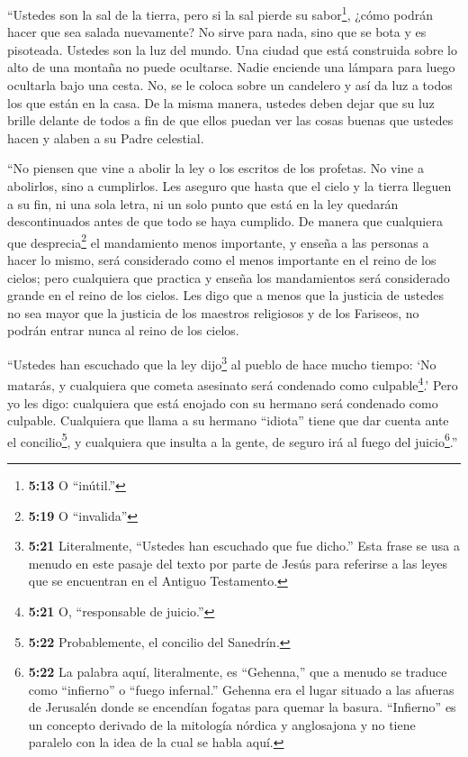  ``Ustedes son la sal de la tierra, pero si la sal pierde
su sabor\footnote{\textbf{5:13} O ``inútil.''}, ¿cómo podrán hacer que
sea salada nuevamente? No sirve para nada, sino que se bota y es
pisoteada.  Ustedes son la luz del mundo. Una ciudad que
está construida sobre lo alto de una montaña no puede ocultarse.
 Nadie enciende una lámpara para luego ocultarla bajo una
cesta. No, se le coloca sobre un candelero y así da luz a todos los que
están en la casa.  De la misma manera, ustedes deben dejar
que su luz brille delante de todos a fin de que ellos puedan ver las
cosas buenas que ustedes hacen y alaben a su Padre celestial.

 ``No piensen que vine a abolir la ley o los escritos de
los profetas. No vine a abolirlos, sino a cumplirlos.  Les
aseguro que hasta que el cielo y la tierra lleguen a su fin, ni una sola
letra, ni un solo punto que está en la ley quedarán descontinuados antes
de que todo se haya cumplido.  De manera que cualquiera que
desprecia\footnote{\textbf{5:19} O ``invalida''} el mandamiento menos
importante, y enseña a las personas a hacer lo mismo, será considerado
como el menos importante en el reino de los cielos; pero cualquiera que
practica y enseña los mandamientos será considerado grande en el reino
de los cielos.  Les digo que a menos que la justicia de
ustedes no sea mayor que la justicia de los maestros religiosos y de los
Fariseos, no podrán entrar nunca al reino de los cielos.

 ``Ustedes han escuchado que la ley dijo\footnote{\textbf{5:21}
  Literalmente, ``Ustedes han escuchado que fue dicho.'' Esta frase se
  usa a menudo en este pasaje del texto por parte de Jesús para
  referirse a las leyes que se encuentran en el Antiguo Testamento.} al
pueblo de hace mucho tiempo: `No matarás, y cualquiera que cometa
asesinato será condenado como culpable\footnote{\textbf{5:21} O,
  ``responsable de juicio.''}.'  Pero yo les digo:
cualquiera que está enojado con su hermano será condenado como culpable.
Cualquiera que llama a su hermano ``idiota'' tiene que dar cuenta ante
el concilio\footnote{\textbf{5:22} Probablemente, el concilio del
  Sanedrín.}, y cualquiera que insulta a la gente, de seguro irá al
fuego del juicio\footnote{\textbf{5:22} La palabra aquí, literalmente,
  es ``Gehenna,'' que a menudo se traduce como ``infierno'' o ``fuego
  infernal.'' Gehenna era el lugar situado a las afueras de Jerusalén
  donde se encendían fogatas para quemar la basura. ``Infierno'' es un
  concepto derivado de la mitología nórdica y anglosajona y no tiene
  paralelo con la idea de la cual se habla aquí.}.''

